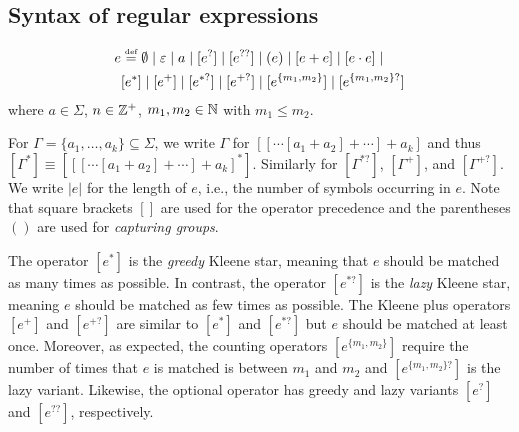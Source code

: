 \subsection{Syntax of regular expressions}

\begin{definition}
	
\[
\begin{split}
e & \eqdef  \emptyset \mid \varepsilon \mid a \mid [e^?] \mid [e^{??}] \mid  (e) \mid %
[e + e] \mid [e \concat e] \mid \\
 &          [e^*] \mid [e^+] \mid [e^{*?}] \mid  [e^{+?}] \mid [e^{\{m_1,m_2\}}] \mid [e^{\{m_1,m_2\}?}] 
\end{split}
\]
%	
where $a \in \Sigma$,  $n \in \mathbb{Z}^+$, $m_1,m_2 \in \mathbb{N}$ with $m_1 \le m_2$. 
\end{definition}
%
For $\Gamma = \{a_1, \ldots, a_k\}\subseteq \Sigma$, we write $\Gamma$ for  $[[\cdots [a_1 + a_2] + \cdots] + a_k]$ and thus $[\Gamma^\ast] \equiv [[[\cdots [a_1 + a_2] + \cdots] + a_k]^\ast]$. Similarly for $[\Gamma^{\ast?}]$, $[\Gamma^+]$, and $[\Gamma^{+?}]$. We write $|e|$ for the length of $e$, i.e., the number of symbols occurring in $e$.
%
Note that square brackets $[]$ are used for the operator precedence and the parentheses $()$ are used for \emph{capturing groups}. 
%

The operator $[e^*]$ is the \emph{greedy} Kleene star, meaning that $e$ should be matched as many times as possible. In contrast, the operator $[e^{*?}]$ is the \emph{lazy} Kleene star, meaning $e$ should be matched  as few times as possible. The Kleene plus operators $[e^+]$ and $[e^{+?}]$ are similar to $[e^*]$ and $[e^{*?}]$ but $e$ should be matched at least once. Moreover, as expected,  the counting operators $[e^{\{m_1,m_2\}}]$ require the number of times that $e$ is matched is between $m_1$ and $m_2$ and $[e^{\{m_1,m_2\}?}]$ is the lazy variant. Likewise, the optional operator has greedy and lazy variants $[e^?]$ and $[e^{??}]$, respectively.

